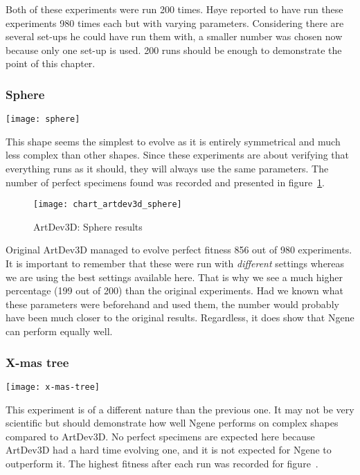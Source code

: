 Both of these experiments were run 200 times. H{\o}ye reported to have run these experiments 980 times each but with varying parameters. Considering there are several set-ups he could have run them with, a smaller number was chosen now because only one set-up is used. 200 runs should be enough to demonstrate the point of this chapter.

\subsubsection{Sphere}
\begin{center}\texttt{[image: sphere]}\end{center}
This shape seems the simplest to evolve as it is entirely symmetrical and much less complex than other shapes. Since these experiments are about verifying that everything runs as it should, they will always use the same parameters. The number of perfect specimens found was recorded and presented in figure~\ref{fig:chart_artdev3d_sphere}.

\begin{figure}[!ht]
	\centering
	\texttt{[image: chart\_artdev3d\_sphere]}
	\caption{ArtDev3D: Sphere results}
	\label{fig:chart_artdev3d_sphere}
\end{figure}

Original ArtDev3D managed to evolve perfect fitness 856 out of 980 experiments. It is important to remember that these were run with \emph{different} settings whereas we are using the best settings available here. That is why we see a much higher percentage (199 out of 200) than the original experiments. Had we known what these parameters were beforehand and used them, the number would probably have been much closer to the original results. Regardless, it does show that Ngene can perform equally well.

\subsubsection{X-mas tree}
\begin{center}\texttt{[image: x-mas-tree]}\end{center}
This experiment is of a different nature than the previous one. It may not be very scientific but should demonstrate how well Ngene performs on complex shapes compared to ArtDev3D. No perfect specimens are expected here because ArtDev3D had a hard time evolving one, and it is not expected for Ngene to outperform it. The highest fitness after each run was recorded for figure~\label{fig:chart_artdev3d_x-mas-tree}.


